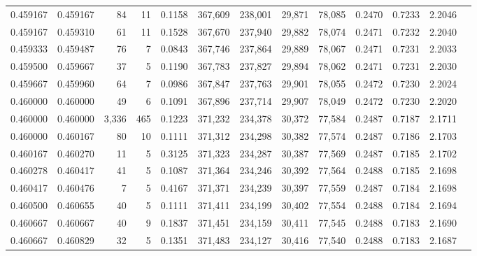 \begin{tabular}{rrrrrrrrrrrrr}
0.459167 & 0.459167 &    84 &  11 &                                     0.1158 & 367,609 & 238,001 &  29,871 &  78,085 & 0.2470 & 0.7233 & 2.2046 \\
0.459167 & 0.459310 &    61 &  11 &                                     0.1528 & 367,670 & 237,940 &  29,882 &  78,074 & 0.2471 & 0.7232 & 2.2040 \\
0.459333 & 0.459487 &    76 &   7 &                                     0.0843 & 367,746 & 237,864 &  29,889 &  78,067 & 0.2471 & 0.7231 & 2.2033 \\
0.459500 & 0.459667 &    37 &   5 &                                     0.1190 & 367,783 & 237,827 &  29,894 &  78,062 & 0.2471 & 0.7231 & 2.2030 \\
0.459667 & 0.459960 &    64 &   7 &                                     0.0986 & 367,847 & 237,763 &  29,901 &  78,055 & 0.2472 & 0.7230 & 2.2024 \\
0.460000 & 0.460000 &    49 &   6 &                                     0.1091 & 367,896 & 237,714 &  29,907 &  78,049 & 0.2472 & 0.7230 & 2.2020 \\
0.460000 & 0.460000 & 3,336 & 465 &                                     0.1223 & 371,232 & 234,378 &  30,372 &  77,584 & 0.2487 & 0.7187 & 2.1711 \\
0.460000 & 0.460167 &    80 &  10 &                                     0.1111 & 371,312 & 234,298 &  30,382 &  77,574 & 0.2487 & 0.7186 & 2.1703 \\
0.460167 & 0.460270 &    11 &   5 &                                     0.3125 & 371,323 & 234,287 &  30,387 &  77,569 & 0.2487 & 0.7185 & 2.1702 \\
0.460278 & 0.460417 &    41 &   5 &                                     0.1087 & 371,364 & 234,246 &  30,392 &  77,564 & 0.2488 & 0.7185 & 2.1698 \\
0.460417 & 0.460476 &     7 &   5 &                                     0.4167 & 371,371 & 234,239 &  30,397 &  77,559 & 0.2487 & 0.7184 & 2.1698 \\
0.460500 & 0.460655 &    40 &   5 &                                     0.1111 & 371,411 & 234,199 &  30,402 &  77,554 & 0.2488 & 0.7184 & 2.1694 \\
0.460667 & 0.460667 &    40 &   9 &                                     0.1837 & 371,451 & 234,159 &  30,411 &  77,545 & 0.2488 & 0.7183 & 2.1690 \\
0.460667 & 0.460829 &    32 &   5 &                                     0.1351 & 371,483 & 234,127 &  30,416 &  77,540 & 0.2488 & 0.7183 & 2.1687 \\

\end{tabular}
